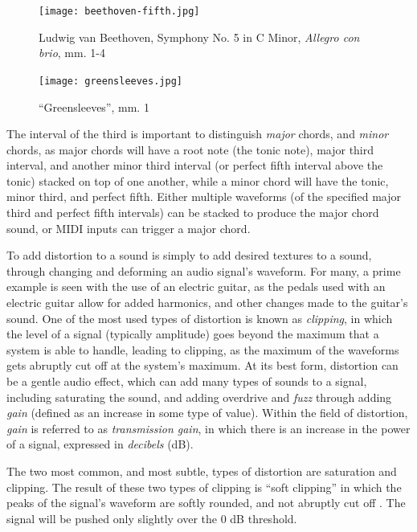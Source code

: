 \begin{figure}
  \centering
  \texttt{[image: beethoven-fifth.jpg]}
  \caption{Ludwig van Beethoven, Symphony No. 5 in C Minor, \textit{Allegro con brio}, mm. 1-4}
  \label{fig:beethoven-fifth}
\end{figure}

\begin{figure}
  \centering
  \texttt{[image: greensleeves.jpg]}
  \caption{``Greensleeves'', mm. 1}
  \label{fig:greensleeves}
\end{figure}

The interval of the third is important to distinguish \textit{major} chords, and \textit{minor} chords, as major chords will have a root note (the tonic note), major third interval, and another minor third interval (or perfect fifth interval above the tonic) stacked on top of one another, while a minor chord will have the tonic, minor third, and perfect fifth. Either multiple waveforms (of the specified major third and perfect fifth intervals) can be stacked to produce the major chord sound, or MIDI inputs can trigger a major chord.

To add distortion to a sound is simply to add desired textures to a sound, through changing and deforming an audio signal's waveform. For many, a prime example is seen with the use of an electric guitar, as the pedals used with an electric guitar allow for added harmonics, and other changes made to the guitar's sound. One of the most used types of distortion is known as \textit{clipping}, in which the level of a signal (typically amplitude) goes beyond the maximum that a system is able to handle, leading to clipping, as the maximum of the waveforms gets abruptly cut off at the system's maximum. At its best form, distortion can be a gentle audio effect, which can add many types of sounds to a signal, including saturating the sound, and adding overdrive and \textit{fuzz} through adding \textit{gain} (defined as an increase in some type of value). Within the field of distortion, \textit{gain} is referred to as \textit{transmission gain}, in which there is an increase in the power of a signal, expressed in \textit{decibels} (dB).

The two most common, and most subtle, types of distortion are saturation and clipping. The result of these two types of clipping is ``soft clipping'' in which the peaks of the signal's waveform are softly rounded, and not abruptly cut off \cite{Tarr_2019}. The signal will be pushed only slightly over the 0 dB threshold. 

